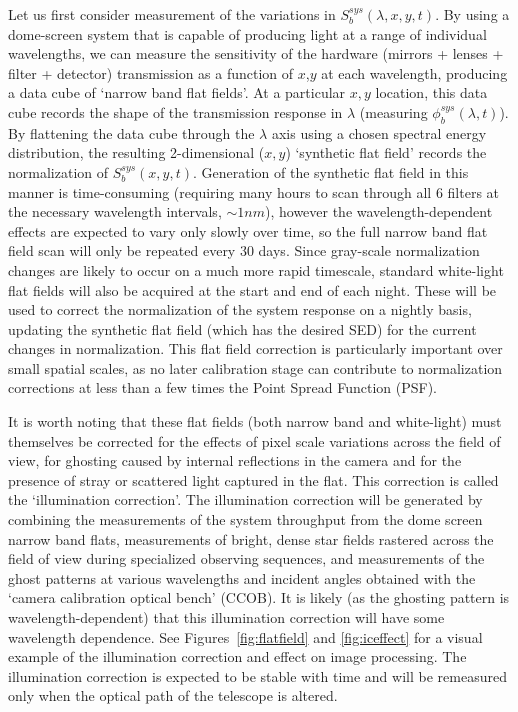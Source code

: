 \documentclass[12pt,preprint]{aastex}
\begin{document}
Let us first consider measurement of the variations in
$S_b^{sys}(\lambda,x,y,t)$.  By using a dome-screen system that is
capable of producing light at a range of individual wavelengths, we
can measure the sensitivity of the hardware (mirrors + lenses + filter
+ detector) transmission as a function of $x$,$y$ at each wavelength,
producing a data cube of `narrow band flat fields'. At a particular
$x,y$ location, this data cube records the shape of the transmission
response in $\lambda$ (measuring $\phi_b^{sys}(\lambda,t)$). By
flattening the data cube through the $\lambda$ axis using a chosen
spectral energy distribution, the resulting 2-dimensional ($x,y$)
`synthetic flat field' records the normalization of
$S_b^{sys}(x,y,t)$. Generation of the synthetic flat field in this
manner is time-consuming (requiring many hours to scan through all 6
filters at the necessary wavelength intervals, $\sim1nm$), however the
wavelength-dependent effects are expected to vary only slowly over
time, so the full narrow band flat field scan will only be repeated
every 30 days. Since gray-scale normalization changes are likely to
occur on a much more rapid timescale, standard white-light flat fields
will also be acquired at the start and end of each night. These
will be used to correct the normalization of the system response on a
nightly basis, updating the synthetic flat field (which has the
desired SED) for the current changes in normalization. This flat field
correction is particularly important over small spatial scales, as no
later calibration stage can contribute to normalization corrections at
less than a few times the Point Spread Function (PSF).

It is worth noting that these flat fields (both narrow band and
white-light) must themselves be corrected for the effects of pixel
scale variations across the field of view, for ghosting caused by
internal reflections in the camera and for the presence of stray or
scattered light captured in the flat. This correction is called the
`illumination correction'. The illumination correction will be
generated by combining the measurements of the system throughput from
the dome screen narrow band flats, measurements of bright, dense star
fields rastered across the field of view during specialized observing
sequences, and measurements of the ghost patterns at various
wavelengths and incident angles obtained with the `camera calibration
optical bench' (CCOB).  It is likely (as the ghosting pattern is
wavelength-dependent) that this illumination correction will have some
wavelength dependence. See Figures~\ref{fig:flatfield} and
\ref{fig:iceffect} for a visual example of the illumination correction
and effect on image processing. The illumination correction is expected 
to be stable with time and will be remeasured only when the optical path
of the telescope is altered. 
\end{document}
